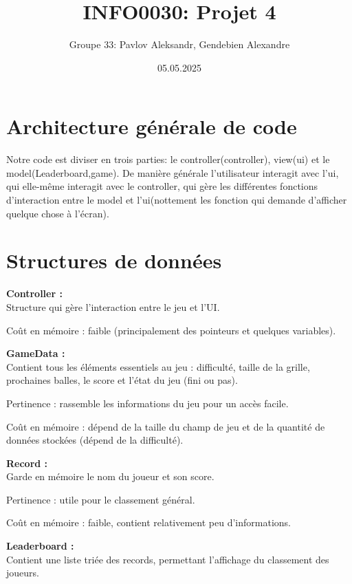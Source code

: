 \documentclass[a4paper, 11pt, oneside]{article}
\begin{document}

\title{INFO0030: Projet 4}
\author{Groupe 33: Pavlov Aleksandr, Gendebien Alexandre}
\date{05.05.2025}

\maketitle
\section{Architecture générale de code}

Notre code est diviser en trois parties: le controller(controller), view(ui) et le model(Leaderboard,game).
De manière générale l'utilisateur interagit avec l'ui, qui elle-même interagit avec le controller,
qui gère les différentes fonctions d'interaction entre le model et l'ui(nottement les fonction qui demande d'afficher quelque chose à l'écran).

\section{Structures de données}

\textbf{Controller :}\\
Structure qui gère l’interaction entre le jeu et l’UI.

Coût en mémoire : faible (principalement des pointeurs et quelques variables).

\textbf{GameData :}\\
Contient tous les éléments essentiels au jeu : difficulté, taille de la grille, prochaines balles, le score et l'état du jeu (fini ou pas).

Pertinence : rassemble les informations du jeu pour un accès facile.

Coût en mémoire : dépend de la taille du champ de jeu et de la quantité de données stockées (dépend de la difficulté).

\textbf{Record :}\\
Garde en mémoire le nom du joueur et son score.

Pertinence : utile pour le classement général.

Coût en mémoire : faible, contient relativement peu d'informations.

\textbf{Leaderboard :}\\
Contient une liste triée des records, permettant l'affichage du classement des joueurs.
\end{document}
